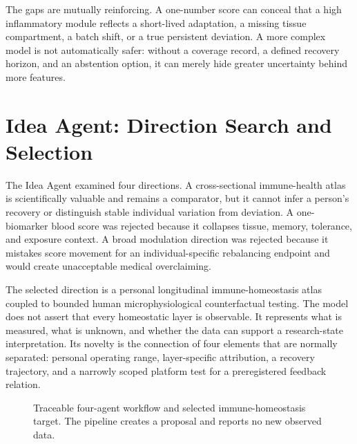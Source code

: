 \documentclass[conference]{IEEEtran}
\begin{document}
The gaps are mutually reinforcing. A one-number score can conceal that a high inflammatory module reflects a short-lived adaptation, a missing tissue compartment, a batch shift, or a true persistent deviation. A more complex model is not automatically safer: without a coverage record, a defined recovery horizon, and an abstention option, it can merely hide greater uncertainty behind more features.

\section{Idea Agent: Direction Search and Selection}

The Idea Agent examined four directions. A cross-sectional immune-health atlas is scientifically valuable and remains a comparator, but it cannot infer a person's recovery or distinguish stable individual variation from deviation. A one-biomarker blood score was rejected because it collapses tissue, memory, tolerance, and exposure context. A broad modulation direction was rejected because it mistakes score movement for an individual-specific rebalancing endpoint and would create unacceptable medical overclaiming.

The selected direction is a personal longitudinal immune-homeostasis atlas coupled to bounded human microphysiological counterfactual testing. The model does not assert that every homeostatic layer is observable. It represents what is measured, what is unknown, and whether the data can support a research-state interpretation. Its novelty is the connection of four elements that are normally separated: personal operating range, layer-specific attribution, a recovery trajectory, and a narrowly scoped platform test for a preregistered feedback relation.

\begin{figure}[t]
\centering
{}
\caption{Traceable four-agent workflow and selected immune-homeostasis target. The pipeline creates a proposal and reports no new observed data.}
\label{fig:workflow}
\end{figure}
\end{document}
